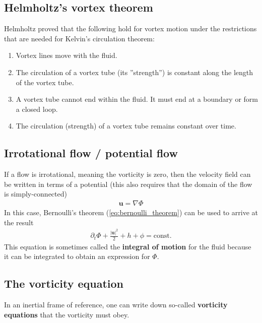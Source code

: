 \documentclass[a4paper, 12pt]{article}
\numberwithin{equation}{subsubsection}
\begin{document}
\subsection{Helmholtz's vortex theorem}
Helmholtz proved that the following hold for vortex motion under the restrictions that are needed for Kelvin's circulation theorem:
\begin{enumerate}
	\item Vortex lines move with the fluid.
	\item The circulation of a vortex tube (its ''strength'') is constant along the length of the vortex tube.
	\item A vortex tube cannot end within the fluid. It must end at a boundary or form a closed loop.
	\item The circulation (strength) of a vortex tube remains constant over time.
\end{enumerate}

\subsection{Irrotational flow / potential flow}
If a flow is irrotational, meaning the vorticity is zero, then the velocity field can be written in terms of a potential (this also requires that the domain of the flow is simply-connected)
\begin{align}
	\mathbf{u} = \nabla \Phi
\end{align}
In this case, Bernoulli's theorem (\ref{eq:bernoulli_theorem}) can be used to arrive at the result
\begin{align}
	\partial_t \Phi + \frac{|\mathbf{u}|^2}{2} + h + \phi = \text{const.}
\end{align}
This equation is sometimes called the \textbf{integral of motion} for the fluid because it can be integrated to obtain an expression for $\Phi$.

\subsection{The vorticity equation}
In an inertial frame of reference, one can write down so-called \textbf{vorticity equations} that the vorticity must obey.
\end{document}
